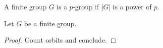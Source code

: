 \begin{definition}[P-group]
\label{def:p_group}
A finite group $G$ is a $p$-group if $|G|$ is a power of $p$.
\end{definition}

\begin{theorem}
\label{thm:sylow_exists}
Let $G$ be a finite group.
\end{theorem}
\begin{proof}
Count orbits and conclude.
\end{proof}
